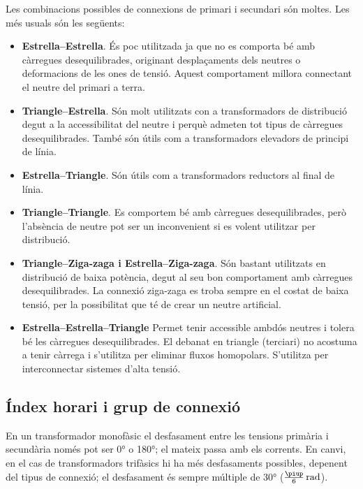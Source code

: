 Les combinacions possibles de connexions de primari i secundari són moltes. Les més usuals són les següents:
\begin{itemize}
   \item \textbf{Estrella--Estrella}. És poc utilitzada ja que no es comporta bé amb càrregues desequilibrades, originant desplaçaments dels neutres o deformacions de les ones de tensió. Aquest comportament millora connectant el neutre del primari a terra.
   \item \textbf{Triangle--Estrella}. Són molt utilitzats con a transformadors de distribució degut a la accessibilitat del neutre i perquè admeten tot tipus de càrregues desequilibrades. També són útils com a transformadors elevadors de principi de línia.
   \item \textbf{Estrella--Triangle}. Són útils com a transformadors reductors al final de línia.
   \item \textbf{Triangle--Triangle}. Es comportem bé amb càrregues desequilibrades, però l'absència de neutre pot ser un inconvenient si es volent utilitzar per distribució.
   \item \textbf{Triangle--Ziga-zaga i Estrella--Ziga-zaga}. Són bastant utilitzats en distribució de baixa potència, degut al seu bon comportament amb càrregues desequilibrades. La connexió ziga-zaga es troba sempre en el costat de baixa tensió, per la possibilitat que té de crear un neutre artificial.
   \item \textbf{Estrella--Estrella--Triangle} Permet tenir accessible ambdós  neutres i tolera  bé les càrregues  desequilibrades. El debanat en triangle (terciari) no acostuma a tenir càrrega i s'utilitza per eliminar fluxos homopolars. S'utilitza per interconnectar sistemes d'alta tensió.
\end{itemize}


\subsection{Índex horari i grup de connexió}\label{sec:connex-index-horari}

En un transformador monofàsic el desfasament entre les tensions primària i secundària només pot ser \ang{0} o \ang{180}; el mateix passa amb els corrents. En canvi, en el cas de transformadors trifàsics hi ha més desfasaments possibles, depenent del tipus de connexió; el desfasament és sempre múltiple de \ang{30} ($\frac{\piup}{6}\si{\,rad}$).

